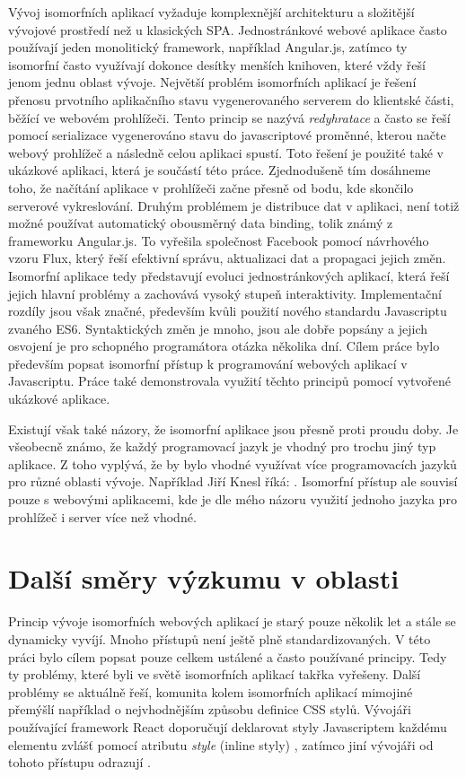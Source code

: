 Vývoj isomorfních aplikací vyžaduje komplexnější architekturu a složitější vývojové prostředí než u klasických SPA. Jednostránkové webové aplikace často používají jeden monolitický framework, například Angular.js, zatímco ty isomorfní často využívají dokonce desítky menších knihoven, které vždy řeší jenom jednu oblast vývoje. Největší problém isomorfních aplikací je řešení přenosu prvotního aplikačního stavu vygenerovaného serverem do klientské části, běžící ve webovém prohlížeči. Tento princip se nazývá \textit{redyhratace} a často se řeší pomocí serializace vygenerováno stavu do javascriptové proměnné, kterou načte webový prohlížeč a následně celou aplikaci spustí. Toto řešení je použité také v ukázkové aplikaci, která je součástí této práce. Zjednodušeně tím dosáhneme toho, že načítání aplikace v prohlížeči začne přesně od bodu, kde skončilo serverové vykreslování. Druhým problémem je distribuce dat v aplikaci, není totiž možné používat automatický obousměrný data binding, tolik známý z frameworku Angular.js. To vyřešila společnost Facebook pomocí návrhového vzoru Flux, který řeší efektivní správu, aktualizaci dat a propagaci jejich změn. Isomorfní aplikace tedy představují evoluci jednostránkových aplikací, která řeší jejich hlavní problémy a zachovává vysoký stupeň interaktivity. Implementační rozdíly jsou však značné, především kvůli použití nového standardu Javascriptu zvaného ES6. Syntaktických změn je mnoho, jsou ale dobře popsány a jejich osvojení je pro schopného programátora otázka několika dní. Cílem práce bylo především popsat isomorfní přístup k programování webových aplikací v Javascriptu. Práce také demonstrovala využití těchto principů pomocí vytvořené ukázkové aplikace.

Existují však také názory, že isomorfní aplikace jsou přesně proti proudu doby. Je všeobecně známo, že každý programovací jazyk je vhodný pro trochu jiný typ aplikace. Z toho vyplývá, že by bylo vhodné využívat více programovacích jazyků pro různé oblasti vývoje. Například Jiří Knesl říká:  \cite{knesl}. Isomorfní přístup ale souvisí pouze s webovými aplikacemi, kde je dle mého názoru využití jednoho jazyka pro prohlížeč i server více než vhodné.

\section{Další směry výzkumu v oblasti}
Princip vývoje isomorfních webových aplikací je starý pouze několik let a stále se dynamicky vyvíjí. Mnoho přístupů není ještě plně standardizovaných. V této práci bylo cílem popsat pouze celkem ustálené a často používané principy. Tedy ty problémy, které byli ve světě isomorfních aplikací takřka vyřešeny. Další problémy se aktuálně řeší, komunita kolem isomorfních aplikací mimojiné přemýšlí například o nejvhodnějším způsobu definice CSS stylů. Vývojáři používající framework React doporučují deklarovat styly Javascriptem každému elementu zvlášť pomocí atributu \textit{style} (inline styly) \cite{react_css}, zatímco jiní vývojáři od tohoto přístupu odrazují \cite{inline_styles_hate}. 

